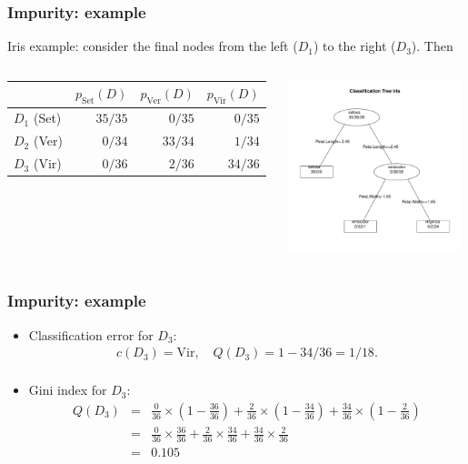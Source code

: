 \begin{frame}
\frametitle{Impurity: example}
Iris example: consider the final nodes from the left ($D_1$) to the right ($D_3$). Then
\begin{columns}
\begin{column}{0.5\textwidth}
\scriptsize
\begin{tabular}{|l|r|r|r|}
\hline
& $p_{\mbox{Set}}(D)$ & $p_{\mbox{Ver}}(D)$ & $p_{\mbox{Vir}}(D)$ \\
\hline
$D_1$ (Set) & $35/35$ & $0/35$ & $0/35$\\
\hline
$D_2$ (Ver) & $0/34$ & $33/34$ & $1/34$\\
\hline
$D_3$ (Vir) & $0/36$ & $2/36$ & $34/36$\\
\hline
\end{tabular}
\normalsize
\end{column}
\begin{column}{0.5\textwidth}
\begin{center}
\includegraphics[width=5cm]{../../Graphs/IRIS_CART.pdf}
\end{center}
\end{column}
\end{columns}
\end{frame}
\begin{frame}
\frametitle{Impurity: example}
\begin{itemize}
\item Classification error for $D_3$:  
\begin{eqnarray*}
c(D_3)= \mbox{Vir}, \quad Q(D_3)= 1 - 34/36 = 1/18.\\
\end{eqnarray*}
\item Gini index for $D_3$:
\begin{eqnarray*}
Q(D_3)&=& \frac{0}{36}\times\left(1-\frac{36}{36}\right) + \frac{2}{36}\times\left(1-\frac{34}{36}\right) + \frac{34}{36}\times \left(1-\frac{2}{36}\right)\\
&=& \frac{0}{36}\times\frac{36}{36} + \frac{2}{36}\times\frac{34}{36} + \frac{34}{36}\times\frac{2}{36}\\
&=& 0.105\\
\end{eqnarray*}
\end{itemize}
\end{frame}
